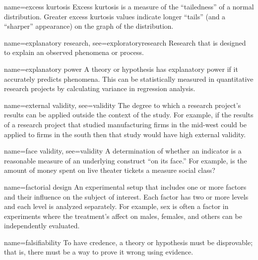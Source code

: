
{name={excess kurtosis}}
{%
	Excess kurtosis is a measure of the ``tailedness'' of a normal distribution. Greater excess kurtosis values indicate longer ``tails'' (and a ``sharper'' appearance) on the graph of the distribution.
}

{name={explanatory research},
	see={exploratoryresearch}}
{%
	Research that is designed to explain an observed phenomena or process. 
}

{name={explanatory power}}
{%
	A theory or hypothesis has explanatory power if it accurately predicts phenomena. This can be statistically measured in quantitative research projects by calculating variance in regression analysis.
}


{name={external validity},
	see={validity}}
{%
	The degree to which a research project's results can be applied outside the context of the study. For example, if the results of a research project that studied manufacturing firms in the mid-west could be applied to firms in the south then that study would have high external validity.
}

{name={face validity},
	see={validity}}
{%
	A determination of whether an indicator is a reasonable measure of an underlying construct ``on its face.'' For example, is the amount of money spent on live theater tickets a measure social class?
}

{name={factorial design}}
{%
	An experimental setup that includes one or more factors and their influence on the subject of interest. Each factor has two or more levels and each level is analyzed separately. For example, sex is often a factor in experiments where the treatment's affect on males, females, and others can be independently evaluated.
}

{name={falsifiability}}
{%
	To have credence, a theory or hypothesis must be disprovable; that is, there must be a way to prove it wrong using evidence.
}

